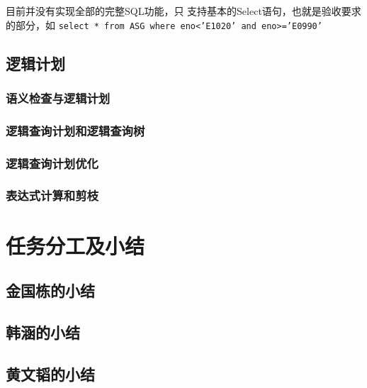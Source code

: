 \documentclass[a4paper, 12pt]{ctexart}
\begin{document}
目前并没有实现全部的完整SQL功能，只
支持基本的Select语句，也就是验收要求的部分，如
\lstinline|select * from ASG where eno<’E1020’ and eno>=’E0990’| 





\subsection{逻辑计划}
\subsubsection{语义检查与逻辑计划}

\subsubsection{逻辑查询计划和逻辑查询树}
\subsubsection{逻辑查询计划优化}
\subsubsection{表达式计算和剪枝}

\section{任务分工及小结}

\subsection{金国栋的小结}

\subsection{韩涵的小结}

\subsection{黄文韬的小结}
\end{document}
